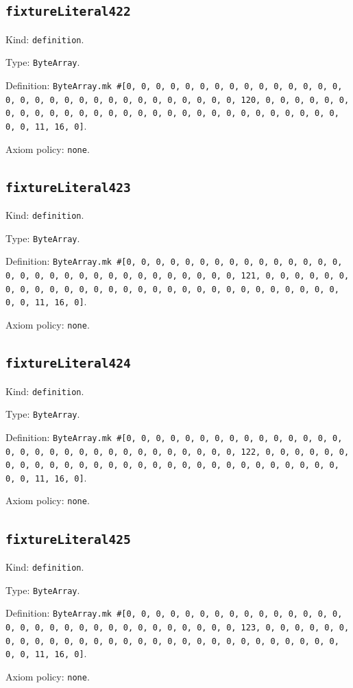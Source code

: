 \documentclass[11pt]{article}
\begin{document}
\subsection*{\texttt{fixtureLiteral422}}
\noindent Kind: \texttt{definition}.\par
\noindent Type: \texttt{ByteArray}.\par
\noindent Definition: \texttt{ByteArray.mk \#[0, 0, 0, 0, 0, 0, 0, 0, 0, 0, 0, 0, 0, 0, 0, 0, 0, 0, 0, 0, 0, 0, 0, 0, 0, 0, 0, 0, 0, 0, 0, 120, 0, 0, 0, 0, 0, 0, 0, 0, 0, 0, 0, 0, 0, 0, 0, 0, 0, 0, 0, 0, 0, 0, 0, 0, 0, 0, 0, 0, 0, 0, 0, 11, 16, 0]}.\par
\noindent Axiom policy: \texttt{none}.\par
\subsection*{\texttt{fixtureLiteral423}}
\noindent Kind: \texttt{definition}.\par
\noindent Type: \texttt{ByteArray}.\par
\noindent Definition: \texttt{ByteArray.mk \#[0, 0, 0, 0, 0, 0, 0, 0, 0, 0, 0, 0, 0, 0, 0, 0, 0, 0, 0, 0, 0, 0, 0, 0, 0, 0, 0, 0, 0, 0, 0, 121, 0, 0, 0, 0, 0, 0, 0, 0, 0, 0, 0, 0, 0, 0, 0, 0, 0, 0, 0, 0, 0, 0, 0, 0, 0, 0, 0, 0, 0, 0, 0, 11, 16, 0]}.\par
\noindent Axiom policy: \texttt{none}.\par
\subsection*{\texttt{fixtureLiteral424}}
\noindent Kind: \texttt{definition}.\par
\noindent Type: \texttt{ByteArray}.\par
\noindent Definition: \texttt{ByteArray.mk \#[0, 0, 0, 0, 0, 0, 0, 0, 0, 0, 0, 0, 0, 0, 0, 0, 0, 0, 0, 0, 0, 0, 0, 0, 0, 0, 0, 0, 0, 0, 0, 122, 0, 0, 0, 0, 0, 0, 0, 0, 0, 0, 0, 0, 0, 0, 0, 0, 0, 0, 0, 0, 0, 0, 0, 0, 0, 0, 0, 0, 0, 0, 0, 11, 16, 0]}.\par
\noindent Axiom policy: \texttt{none}.\par
\subsection*{\texttt{fixtureLiteral425}}
\noindent Kind: \texttt{definition}.\par
\noindent Type: \texttt{ByteArray}.\par
\noindent Definition: \texttt{ByteArray.mk \#[0, 0, 0, 0, 0, 0, 0, 0, 0, 0, 0, 0, 0, 0, 0, 0, 0, 0, 0, 0, 0, 0, 0, 0, 0, 0, 0, 0, 0, 0, 0, 123, 0, 0, 0, 0, 0, 0, 0, 0, 0, 0, 0, 0, 0, 0, 0, 0, 0, 0, 0, 0, 0, 0, 0, 0, 0, 0, 0, 0, 0, 0, 0, 11, 16, 0]}.\par
\noindent Axiom policy: \texttt{none}.\par
\end{document}

